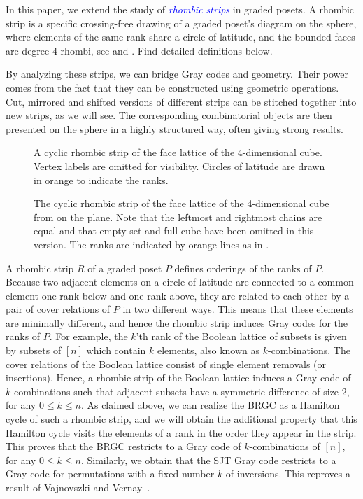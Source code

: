 \documentclass[fontsize=11pt,a4paper,DIV=12]{scrartcl}
\newcommand{\defn}[1]{\textsl{\textcolor{Blue}{#1}}}
\begin{document}
In this paper, we extend the study of \defn{rhombic strips} in graded posets. A rhombic strip is a specific crossing-free drawing of a graded poset's diagram on the sphere, where elements of the same rank share a circle of latitude, and the bounded faces are degree-4 rhombi, see  and . Find detailed definitions below.

By analyzing these strips, we can bridge Gray codes and geometry. Their power comes from the fact that they can be constructed using geometric operations. Cut, mirrored and shifted versions of different strips can be stitched together into new strips, as we will see. The corresponding combinatorial objects are then presented on the sphere in a highly structured way, often giving strong results.

\begin{figure}
	\centering
	
	\caption{A cyclic rhombic strip of the face lattice of the 4-dimensional cube. Vertex labels are omitted for visibility. Circles of latitude are drawn in orange to indicate the ranks.}
	\label{fig:B4 on sphere}
\end{figure}

\begin{figure}
	\centering
	\makebox[\textwidth][c]{
		
	}
	\caption{The cyclic rhombic strip of the face lattice of the 4-dimensional cube from  on the plane. Note that the leftmost and rightmost chains are equal and that empty set and full cube have been omitted in this version. The ranks are indicated by orange lines as in .}
	\label{fig:B4 on plane}
\end{figure}

A rhombic strip $R$ of a graded poset $P$ defines orderings of the ranks of $P$. Because two adjacent elements on a circle of latitude are connected to a common element one rank below and one rank above, they are related to each other by a pair of cover relations of $P$ in two different ways. This means that these elements are minimally different, and hence the rhombic strip induces Gray codes for the ranks of $P$. For example, the $k$'th rank of the Boolean lattice of subsets is given by subsets of $[n]$ which contain $k$ elements, also known as $k$-combinations. The cover relations of the Boolean lattice consist of single element removals (or insertions). Hence, a rhombic strip of the Boolean lattice induces a Gray code of $k$-combinations such that adjacent subsets have a symmetric difference of size 2, for any $0\le k\le n$. As claimed above, we can realize the BRGC as a Hamilton cycle of such a rhombic strip, and we will obtain the additional property that this Hamilton cycle visits the elements of a rank in the order they appear in the strip. This proves that the BRGC restricts to a Gray code of $k$-combinations of $[n]$, for any $0\le k\le n$. Similarly, we obtain that the SJT Gray code restricts to a Gray code for permutations with a fixed number $k$ of inversions. This reproves a result of Vajnovszki and Vernay~\cite{restrictedinversions}.
\end{document}
